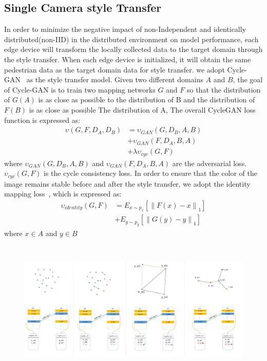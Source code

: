 \documentclass{article}
\begin{document}
\subsection{Single Camera style Transfer}
In order to minimize the negative impact of non-Independent and identically distributed(non-IID) in the distributed environment on model performance, each edge device will transform the locally collected data to the target domain through the style transfer. When each edge device is initialized, it will obtain the same pedestrian data as the target domain data for style transfer. we adopt Cycle-GAN~\cite{zhu2017unpaired} as the style transfer model. Given two different domains $A$ and $B$, the goal of Cycle-GAN is to train two mapping networks $G$ and $F$ so that the distribution of $G(A)$ is as close as possible to the distribution of B and the distribution of $F(B)$ is as close as possible The distribution of A, The overall CycleGAN loss function is expressed as:
\begin{equation}
\begin{aligned}
\upsilon (G,F,D_{A},D_{B})&=\upsilon_{GAN}(G,D_{B},A,B)\\
&+\upsilon_{GAN}(F,D_{A},B,A)\\
&+\lambda \upsilon_{cyc}(G,F)
\end{aligned}
\end{equation}
where $\upsilon_{GAN}(G,D_{B},A,B)$ and $\upsilon_{GAN}(F,D_{A},B,A)$ are the adversarial loss. $\upsilon_{cyc}(G,F)$ is the cycle consistency loss. In order to ensure that the color of the image remains stable before and after the style transfer, we adopt the identity mapping loss~\cite{zhu2017unpaired}, which is expressed as:
\begin{equation}
\begin{aligned}
    \upsilon_{identity}(G,F) & = E_{x\sim p_{x}} \left [ \left \| F(x) - x \right \|_{1} \right ]\\
    &+E_{y\sim p_{y}} \left [ \left \| G(y) - y \right \|_{1} \right ]
\end{aligned}
\end{equation}
where $x\in A$ and $y\in B$



\begin{figure}[htb]
    \includegraphics[width=17.5cm,height=6.5cm]{fig3_all.pdf}
    \caption{}
    \label{}
\end{figure}
\end{document}
